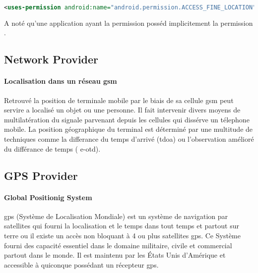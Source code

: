 \begin{lstlisting}[language=xml, caption=permission pour la localisation par GPS.]
<uses-permission android:name="android.permission.ACCESS_FINE_LOCATION"/>
\end{lstlisting}

A noté qu'une application ayant la permission  posséd implicitement la permission . 

\subsection{Network Provider}%

\paragraph{Localisation dans un réseau \gls{gsm} }
Retrouvé la position de terminale mobile par le biais de sa cellule \gls{gsm} peut servire a localisé un objet ou une personne. Il fait intervenir divers moyens de multilatération du signale parvenant depuis les cellules qui dissérve un télephone mobile. La position géographique du terminal est déterminé par une multitude de techniques comme la differance du temps d'arrivé (\gls{tdoa}) ou l'observation amélioré du différance de temps ( \gls{e-otd}).

\subsection{GPS Provider}%
\paragraph{Global Positionig System}\cite{enig:gps}
\gls{gps} (Système de Localisation Mondiale) est un système de navigation par satellites qui fourni la localisation et le temps dans tout temps et partout sur terre ou il existe un accès non bloquant à 4 ou plus satellites \gls{gps}. Ce Système fourni des capacité essentiel dans le domaine militaire, civile et commercial partout dans le monde. Il est maintenu par les États Unis d'Amérique et accessible à quiconque possédant un récepteur \gls{gps}. 
